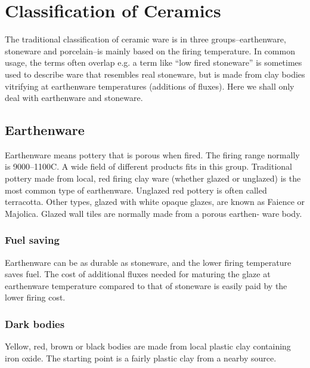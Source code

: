 \section{Classification of Ceramics}
The traditional classification of ceramic ware is in three groups--earthenware, 
stoneware and porcelain--is mainly based on the firing temperature. In common 
usage, the terms often overlap e.g. a term like ``low fired stoneware'' is 
sometimes used to describe ware that resembles real stoneware, but is made from 
clay bodies vitrifying at earthenware temperatures (additions of fluxes). Here 
we shall only deal with earthenware and stoneware.
\subsection{Earthenware}
Earthenware means pottery that is porous when fired. The firing range normally 
is 9000--1100\degree C. A wide field of different products fits in this group. 
Traditional pottery made from local, red firing clay ware (whether glazed or 
unglazed) is the most common type of earthenware. Unglazed red pottery is often 
called terracotta. Other types, glazed with white opaque glazes, are known as 
Faience or Majolica. Glazed wall tiles are normally made from a porous earthen- 
ware body.
\subsubsection{Fuel saving}
Earthenware can be as durable as stoneware, and the lower firing temperature 
saves fuel. The cost of additional fluxes needed for maturing the glaze at 
earthenware temperature compared to that of stoneware is easily paid by the 
lower firing cost.
\subsubsection{Dark bodies}
Yellow, red, brown or black bodies are made from local plastic clay containing 
iron oxide. The starting point is a fairly plastic clay from a nearby source. 

